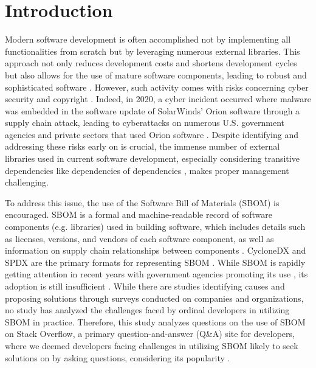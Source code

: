 \documentclass[conference]{IEEEtran}
\begin{document}
\section{Introduction}
Modern software development is often accomplished not by implementing all functionalities from scratch but by leveraging numerous external libraries. This approach not only reduces development costs and shortens development cycles but also allows for the use of mature software components, leading to robust and sophisticated software \cite{study-software-reuse,managing-software-reuse}. However, such activity comes with risks concerning cyber security and copyright \cite{library-usages-updates-risks,oss-supply-chain-attacks,oss-license-violation}. Indeed, in 2020, a cyber incident occurred where malware was embedded in the software update of SolarWinds' Orion software through a supply chain attack, leading to cyberattacks on numerous U.S. government agencies and private sectors that used Orion software \cite{usgov-solarwinds}. Despite identifying and addressing these risks early on is crucial, the immense number of external libraries used in current software development, especially considering transitive dependencies like dependencies of dependencies \cite{dependency-network}, makes proper management challenging.

To address this issue, the use of the Software Bill of Materials (SBOM) is encouraged. SBOM is a formal and machine-readable record of software components (e.g. libraries) used in building software, which includes details such as licenses, versions, and vendors of each software component, as well as information on supply chain relationships between components \cite{ntia-sbom-min-elems,linux-foundation-readiness}. CycloneDX and SPDX are the primary formats for representing SBOM \cite{sbom-history}. While SBOM is rapidly getting attention in recent years with government agencies promoting its use \cite{us-exec-order,eu-cyber-resilience-act}, its adoption is still insufficient \cite{sbom-study,sbom-study-github}. While there are studies identifying causes and proposing solutions through surveys conducted on companies and organizations, no study has analyzed the challenges faced by ordinal developers in utilizing SBOM in practice. Therefore, this study analyzes questions on the use of SBOM on Stack Overflow, a primary question-and-answer (Q\&A) site for developers, where we deemed developers facing challenges in utilizing SBOM likely to seek solutions on by asking questions, considering its popularity \cite{so-popularity}.
\end{document}

